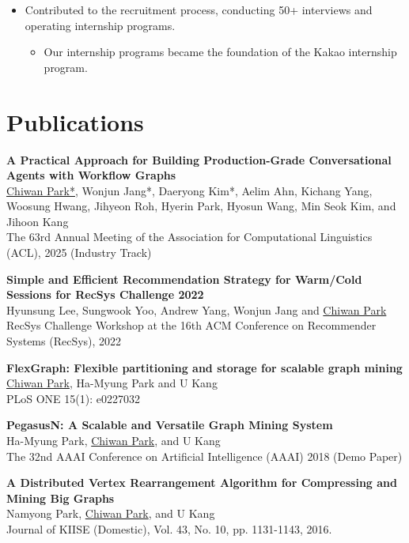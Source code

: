\documentclass[11pt,a4paper]{article}
\newenvironment{entry}{
  \begin{list}{}{
    \setlength{\leftmargin}{0em}
    \setlength{\itemsep}{0.25em}
    \setlength{\parskip}{0pt}
    \setlength{\parsep}{0.25em}
  }
}{
  \end{list}
}
\begin{document}
\begin{entry}
\begin{itemize}
\begin{itemize}
    \end{itemize}
    \item Contributed to the recruitment process, conducting 50+ interviews and operating internship programs.
    \begin{itemize}
      \item Our internship programs became the foundation of the Kakao internship program.
    \end{itemize}
  \end{itemize}
\end{entry}

\section*{Publications}
\begin{entry}
  \item \textbf{A Practical Approach for Building Production-Grade Conversational Agents with Workflow Graphs}\\
  \underline{Chiwan Park*}, Wonjun Jang*, Daeryong Kim*, Aelim Ahn, Kichang Yang, Woosung Hwang, Jihyeon Roh, Hyerin Park, Hyosun Wang, Min Seok Kim, and Jihoon Kang\\
  The 63rd Annual Meeting of the Association for Computational Linguistics (ACL), 2025 (Industry Track)
  \item \textbf{Simple and Efficient Recommendation Strategy for Warm/Cold Sessions for RecSys Challenge 2022}\\
  Hyunsung Lee, Sungwook Yoo, Andrew Yang, Wonjun Jang and \underline{Chiwan Park}\\
  RecSys Challenge Workshop at the 16th ACM Conference on Recommender Systems (RecSys), 2022
  \item \textbf{FlexGraph: Flexible partitioning and storage for scalable graph mining}\\
  \underline{Chiwan Park}, Ha-Myung Park and U Kang\\
  PLoS ONE 15(1): e0227032
  \item \textbf{PegasusN: A Scalable and Versatile Graph Mining System}\\
  Ha-Myung Park, \underline{Chiwan Park}, and U Kang\\
  The 32nd AAAI Conference on Artificial Intelligence (AAAI) 2018 (Demo Paper)
  \item \textbf{A Distributed Vertex Rearrangement Algorithm for Compressing and Mining Big Graphs}\\
  Namyong Park, \underline{Chiwan Park}, and U Kang\\
  Journal of KIISE (Domestic), Vol. 43, No. 10, pp. 1131-1143, 2016.
\end{entry}
\end{document}
